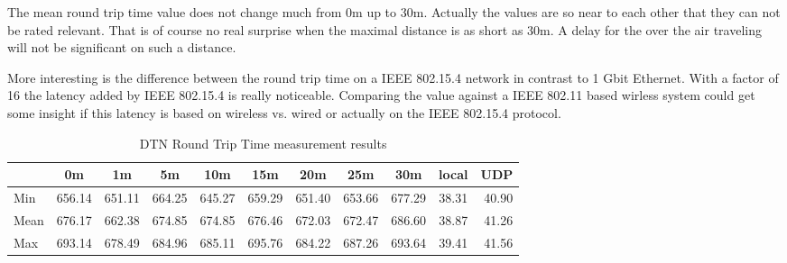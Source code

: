 The mean round trip time value does not change much from 0m up to 30m. Actually
the values are so near to each other that they can not be rated relevant. That
is of course no real surprise when the maximal distance is as short as 30m. A
delay for the over the air traveling will not be significant on such a distance.

More interesting is the difference between the round trip time on a IEEE
802.15.4 network in contrast to 1 Gbit Ethernet. With a factor of 16 the latency
added by IEEE 802.15.4 is really noticeable. Comparing the value against a
IEEE 802.11 based wirless system could get some insight if this latency is based
on wireless vs. wired or actually on the IEEE 802.15.4 protocol.

\begin{table}
\begin{tabular}{l*{9}{c}r}
    & 0m & 1m & 5m & 10m & 15m & 20m & 25m & 30m & local & UDP \\
\hline
Min & 656.14 & 651.11 & 664.25 & 645.27 & 659.29 & 651.40 & 653.66 & 677.29 & 38.31 & 40.90 \\
Mean & 676.17 & 662.38 & 674.85 & 674.85 & 676.46 & 672.03 & 672.47 & 686.60 & 38.87 & 41.26 \\
Max & 693.14 & 678.49 & 684.96 & 685.11 & 695.76 & 684.22 & 687.26 & 693.64 & 39.41 & 41.56 \\
\end{tabular}
\caption{ DTN Round Trip Time measurement results}
\label{dtnrtt}
\end{table}
